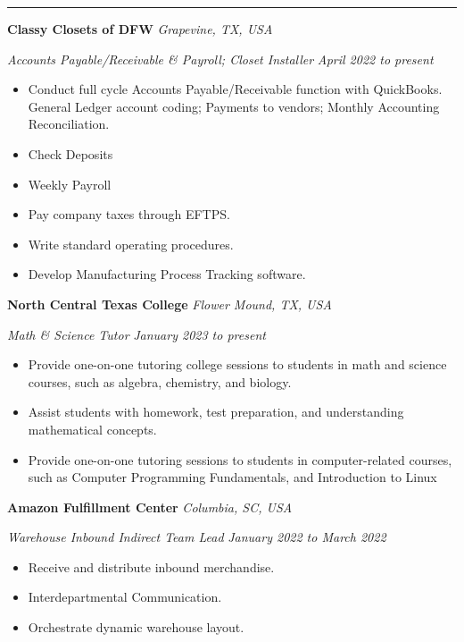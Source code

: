 \documentclass[10pt, a4paper]{article}
\newcommand{\rangesep}{to\xspace}  %
\renewcommand{\date}[1]{\textit{#1}}
\newcommand{\location}[1]{\textit{#1}}
\newcommand{\heading}[1]{
    \makebox[0pt][l]{\Large \sc \hspace{2pt}#1}
    \rule[-0.7ex]{\columnwidth}{0.5pt}\vspace{1.0ex}
}
\newcommand{\subheading}[1]{{\bfseries #1}}
\newcommand{\subheadSkip}{\vspace{0.7ex}}
\newenvironment{mysection}[1]
{\vspace{2.5ex}
\heading{#1}
\begin{adjustwidth}{0.3cm}{0cm}}
{\end{adjustwidth} }
\begin{document}
    \begin{mysection}{Employment}
        \subheading{Classy Closets of DFW} \hfill \location{Grapevine, TX, USA}

        \textit{Accounts Payable/Receivable \& Payroll; Closet Installer } \hfill \date{April 2022 \rangesep present}

        \vspace{0.1ex}


        \begin{itemize}
            \item Conduct full cycle Accounts Payable/Receivable function with QuickBooks. General Ledger account coding; Payments to vendors; Monthly Accounting Reconciliation.
            \item Check Deposits 
            \item Weekly Payroll 
            \item Pay company taxes through EFTPS.
            \item Write standard operating procedures.
            \item Develop Manufacturing Process Tracking software.
        \end{itemize}

        \subheadSkip
        \subheading{North Central Texas College} \hfill \location{Flower Mound, TX, USA}

        \vspace{0.1ex}
        \textit{Math \& Science Tutor} \hfill \date{January 2023 \rangesep present}
        \begin{itemize}
            \item Provide one-on-one tutoring college sessions to students in math and science courses, such as algebra, chemistry, and biology.
            \item Assist students with homework, test preparation, and understanding mathematical concepts.
            \item Provide one-on-one tutoring sessions to students in computer-related courses, such as Computer Programming Fundamentals, and Introduction to Linux 
        \end{itemize}

        \subheadSkip
        \subheading{Amazon Fulfillment Center} \hfill \location{Columbia, SC, USA}

        \vspace{0.1ex}
        \textit{Warehouse Inbound Indirect Team Lead} \hfill \date{January 2022 \rangesep March 2022}
        \begin{itemize}
            \item Receive and distribute inbound merchandise. 
            \item Interdepartmental Communication.
            \item Orchestrate dynamic warehouse layout.
        \end{itemize}

    \end{mysection}
\end{document}
